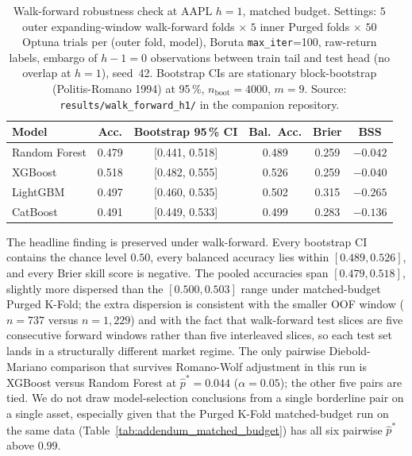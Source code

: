 \documentclass{rQUF2e}
\begin{document}
\begin{table}[H]
\centering
\caption{Walk-forward robustness check at AAPL $h=1$, matched
budget. Settings: $5$ outer expanding-window walk-forward folds
$\times$ $5$ inner Purged folds $\times$ $50$ Optuna trials per
(outer fold, model), Boruta \texttt{max\_iter}=100, raw-return
labels, embargo of $h-1=0$ observations between train tail and
test head (no overlap at $h=1$), seed~42. Bootstrap CIs are
stationary block-bootstrap (Politis-Romano 1994) at 95\,\%,
$n_{\text{boot}}=4000$, $m=9$. Source:
\texttt{results/walk\_forward\_h1/} in the companion
repository.}
\label{tab:addendum_walkforward}
\scriptsize
\begin{tabular}{lccccc}
\toprule
\textbf{Model} & \textbf{Acc.} & \textbf{Bootstrap 95\,\% CI} & \textbf{Bal.\ Acc.} & \textbf{Brier} & \textbf{BSS} \\
\midrule
Random Forest & 0.479 & [0.441, 0.518] & 0.489 & 0.259 & $-0.042$ \\
XGBoost       & 0.518 & [0.482, 0.555] & 0.526 & 0.259 & $-0.040$ \\
LightGBM      & 0.497 & [0.460, 0.535] & 0.502 & 0.315 & $-0.265$ \\
CatBoost      & 0.491 & [0.449, 0.533] & 0.499 & 0.283 & $-0.136$ \\
\bottomrule
\end{tabular}
\end{table}

\noindent The headline finding is preserved under walk-forward.
Every bootstrap CI contains the chance level $0.50$, every
balanced accuracy lies within $[0.489, 0.526]$, and every Brier
skill score is negative. The pooled accuracies span
$[0.479, 0.518]$, slightly more dispersed than the
$[0.500, 0.503]$ range under matched-budget Purged K-Fold; the
extra dispersion is consistent with the smaller OOF window
($n=737$ versus $n=1{,}229$) and with the fact that
walk-forward test slices are five consecutive forward windows
rather than five interleaved slices, so each test set lands in
a structurally different market regime. The only pairwise
Diebold-Mariano comparison that survives Romano-Wolf adjustment
in this run is XGBoost versus Random Forest at
$\hat{p}^{*} = 0.044$ ($\alpha = 0.05$); the other five pairs
are tied. We do not draw model-selection conclusions from a
single borderline pair on a single asset, especially given that
the Purged K-Fold matched-budget run on the same data
(Table~\ref{tab:addendum_matched_budget}) has all six pairwise
$\hat{p}^{*}$ above $0.99$.
\end{document}
